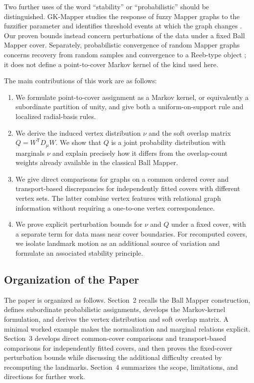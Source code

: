 \documentclass[9pt,a4paper,twocolumn,twoside]{extarticle}
\theoremstyle{definition}
\begin{document}
Two further uses of the word ``stability'' or ``probabilistic'' should be distinguished. GK-Mapper studies the response of fuzzy Mapper graphs to the fuzzifier parameter and identifies threshold events at which the graph changes \cite{sen2026gkmapper}. Our proven bounds instead concern perturbations of the data under a fixed Ball Mapper cover. Separately, probabilistic convergence of random Mapper graphs concerns recovery from random samples and convergence to a Reeb-type object \cite{brown2021randommapper}; it does not define a point-to-cover Markov kernel of the kind used here.

The main contributions of this work are as follows:
\begin{enumerate}
  \item We formulate point-to-cover assignment as a Markov kernel, or equivalently a subordinate partition of unity, and give both a uniform-on-support rule and localized radial-basis rules.
  \item We derive the induced vertex distribution $\nu$ and the soft overlap matrix $Q=W^{\mathsf T}D_{\mu}W$.  We show that $Q$ is a joint probability distribution with marginals $\nu$ and explain precisely how it differs from the overlap-count weights already available in the classical Ball Mapper.
  \item We give direct comparisons for graphs on a common ordered cover and transport-based discrepancies for independently fitted covers with different vertex sets. The latter combine vertex features with relational graph information without requiring a one-to-one vertex correspondence.
  \item We prove explicit perturbation bounds for $\nu$ and $Q$ under a fixed cover, with a separate term for data mass near cover boundaries. For recomputed covers, we isolate landmark motion as an additional source of variation and formulate an associated stability principle.
\end{enumerate}

\subsection{Organization of the Paper}

The paper is organized as follows. Section~2 recalls the Ball Mapper construction, defines subordinate probabilistic assignments, develops the Markov-kernel formulation, and derives the vertex distribution and soft overlap matrix.  A minimal worked example makes the normalization and marginal relations explicit. Section~3 develops direct common-cover comparisons and transport-based comparisons for independently fitted covers, and then proves the fixed-cover perturbation bounds while discussing the additional difficulty created by recomputing the landmarks.  Section~4 summarizes the scope, limitations, and directions for further work.
\end{document}
